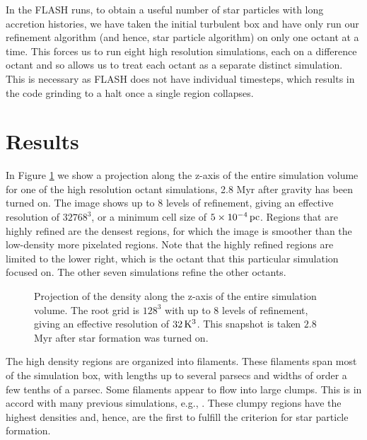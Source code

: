 \documentclass[../dissertation.tex]{subfiles}
\begin{document}
In the FLASH runs, to obtain a useful number of star particles with long accretion histories, we have 
taken the initial turbulent box and have only run our refinement algorithm 
(and hence, star particle algorithm) on only one octant at a time.  
This forces us to run eight high resolution simulations, each on a 
difference octant and so allows us to treat each octant as a separate 
distinct simulation.  This is necessary as FLASH does not have individual 
timesteps, which results in the code grinding to a halt once a single 
region collapses.



\section{Results}\label{sec:hydro_results}
In Figure \ref{fig:hydro_entire projection} we show a projection along the z-axis 
 of the entire simulation volume 
for one of the high resolution octant simulations, 2.8 Myr after gravity has been turned on. 
The image shows up to 8 levels of refinement, giving an effective resolution 
of $32768^3$, or a minimum cell size of $5\times 10^{-4} \,\rm pc$.
Regions that are highly refined are the densest regions, for which the image 
is smoother than the low-density more pixelated regions.  Note that the highly 
refined regions are limited to the lower right, which is the octant that
this particular simulation focused on. The other seven simulations refine the other octants.
%
\begin{figure}[htb] %
\caption[Hydro Simulation Box]{\label{fig:hydro_entire projection}Projection of the density along the z-axis of the entire simulation volume. 
The root grid is $128^3$ with up to 8 levels of refinement, giving an effective resolution of $32\,{\rm K}^3$. 
This snapshot is taken $2.8$ Myr after star formation was turned on.}
\end{figure}
%

The high density regions are organized into filaments.
These filaments span most of the simulation box, with lengths up to 
several parsecs and widths of order a few tenths of a parsec. Some filaments appear 
to flow into large clumps. This is in accord with many previous simulations, e.g., 
\citep{1998ApJ...504..300P, 2015ApJ...800...49L}. These clumpy regions 
have the highest densities and, hence, are the first to fulfill 
the criterion for star particle formation.
\end{document}
